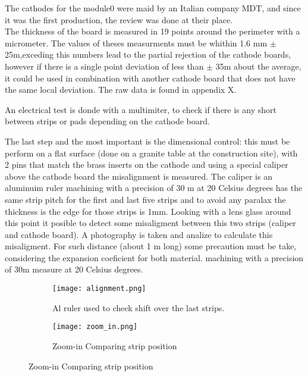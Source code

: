 The cathodes for the module0 were maid by an Italian company MDT, and since it was the first production, the review was
done at their place.\\ The thickness of the board is measured in 19 points around the perimeter with a micrometer. The
values of theses measurments must be whithin 1.6 mm $\pm$25\micro m,exceding this numbers lead to the partial rejection
of the cathode boards, however if there is a single point deviation of less than $\pm$ 35\micro m about the average, it
could be used in combination with another cathode board that does not have the same local deviation. The raw data is
found in appendix X.\par An electrical test is donde with a multimiter, to check if there is any short between strips or
pads depending on the cathode board.\par The last step and the most important is the dimensional control: this must be
perform on a flat surface (done on a granite table at the construction site), with 2 pins that match the brass inserts
on the cathode and using a special caliper above the cathode board the misalignment is measured. The caliper is an
aluminuim ruler machining  with a precision of 30 \micro m at 20 Celsius degrees  has the same strip pitch for the first
and last five strips and to avoid any paralax the thickness is the edge for those strips is 1mm. Looking with a lens
glass around this point it posible to detect some misaligment between this two strips (caliper and cathode board). A
photography is taken and analize to calculate this misaligment. For such distance (about 1 m long) some precaution must
be take, considering the expansion coeficient for both material.  machining with a precision of 30\micro m measure at 20
Celsius degrees.\par

\begin{figure}[ht]
	\hfill
	\centering
	\begin{subfigure}[b]{0.35\textwidth}
		\centering
		\texttt{[image: alignment.png]}
		\caption{Al ruler used to check shift over the last strips.}
		\label{fig:ruler}
	\end{subfigure}
	\hfill
	\begin{subfigure}[b]{0.35\textwidth}
		\centering
		\texttt{[image: zoom\_in.png]}
		\caption{Zoom-in Comparing strip position}
		\label{fig:zoom}
	\end{subfigure}
	\hfill
\end{figure}

